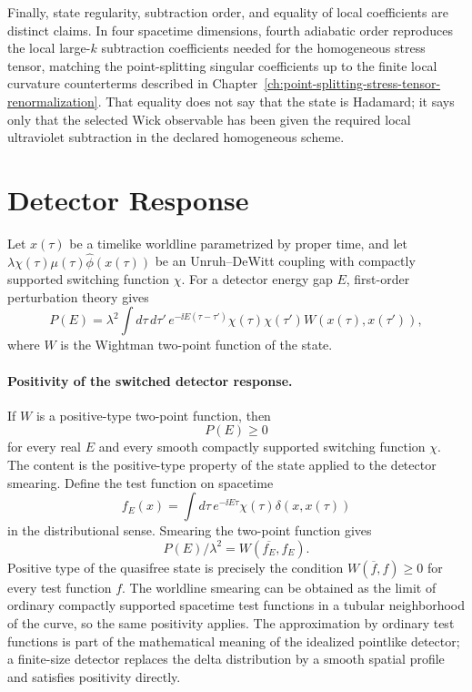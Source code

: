 Finally, state regularity, subtraction order, and equality of local
coefficients are distinct claims.  In four spacetime dimensions, fourth
adiabatic order reproduces the local large-\(k\) subtraction coefficients needed
for the homogeneous stress tensor, matching the point-splitting singular
coefficients up to the finite local curvature counterterms described in
Chapter~\ref{ch:point-splitting-stress-tensor-renormalization}.  That equality
does not say that the state is Hadamard; it says only that the selected Wick
observable has been given the required local ultraviolet subtraction in the
declared homogeneous scheme.

\section{Detector Response}

Let \(x(\tau)\) be a timelike worldline parametrized by proper time, and let
\(\lambda\chi(\tau)\mu(\tau)\widehat\phi(x(\tau))\) be an Unruh--DeWitt
coupling with compactly supported switching function \(\chi\).  For a
detector energy gap \(E\), first-order perturbation theory gives
\begin{equation}
  P(E)
  =
  \lambda^2
  \int d\tau\,d\tau'\,
  e^{-\ii E(\tau-\tau')}
  \chi(\tau)\chi(\tau')
  W(x(\tau),x(\tau')),
  \label{eq:cosmological-detector-response}
\end{equation}
where \(W\) is the Wightman two-point function of the state.

\paragraph{Positivity of the switched detector response.}
If \(W\) is a positive-type two-point function, then
\[
  P(E)\geq0
  \]
for every real \(E\) and every smooth compactly supported switching function
\(\chi\).
The content is the positive-type property of the state applied to the detector
smearing.  Define the test function on
spacetime
\[
  f_E(x)
  =
  \int d\tau\,
  e^{-\ii E\tau}\chi(\tau)\delta(x,x(\tau))
  \]
in the distributional sense.  Smearing the two-point function gives
\[
  P(E)/\lambda^2
  =
  W(\overline{f_E},f_E).
  \]
Positive type of the quasifree state is precisely the condition
\(W(\overline f,f)\geq0\) for every test function \(f\).  The worldline
smearing can be obtained as the limit of ordinary compactly supported
spacetime test functions in a tubular neighborhood of the curve, so the same
positivity applies.  The approximation by ordinary test functions is part of
the mathematical meaning of the idealized pointlike detector; a finite-size
detector replaces the delta distribution by a smooth spatial profile and
satisfies positivity directly.


